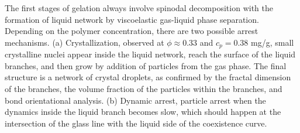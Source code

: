 \documentclass[preprint,amsmath,amssymb,superscriptaddress]{revtex4-1}
\begin{document}
% 

The first stages of gelation always involve spinodal decomposition with the formation
of liquid network by viscoelastic gas-liquid phase separation. 
Depending on the polymer concentration, there are two possible arrest mechanisms. 
(a) Crystallization, observed at $\phi\approx 0.33$ and $c_p=0.38$ mg/g, small crystalline nuclei appear inside the liquid network, reach the surface 
 of the liquid branches, and then grow by addition of particles from the gas phase. The final structure is a network of crystal droplets,
 as confirmed by the fractal dimension of the branches, the volume fraction of the particles within the branches, and bond orientational analysis. 
(b) Dynamic arrest, particle arrest when the dynamics inside the liquid branch becomes slow, which should happen at the intersection of the
 glass line with the liquid side of the coexistence curve. 
\end{document}
